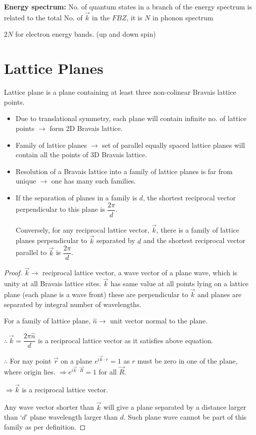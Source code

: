 \noindent
{\bf Energy spectrum:} No. of quantum states in a branch of the energy spectrum is related to the total No. of $\overrightarrow{k}$ in the $FBZ$, it is $N$ in phonon spectrum

$2N$ for electron energy bands. (up and down spin)

\section*{Lattice Planes}

Lattice plane is a plane containing at least three non-colinear Bravais lattice points.
\begin{itemize}
\item Due to translational symmetry, each plane will contain infinite no. of lattice points $\to$ form 2D Bravais lattice.

\item Family of lattice planes $\to$ set of parallel equally spaced lattice planes will contain all the points of 3D Bravais lattice.

\item Resolution of a Bravais lattice into a family of lattice planes is far from unique $\to$ one has many such families.

\item If the separation of planes in a family is $d$, the shortest reciprocal vector perpendicular to this plane is $\dfrac{2\pi}{d}$.

Conversely, for any reciprocal lattice vector, $\overrightarrow{k}$, there is a family of lattice planes perpendicular to $\overrightarrow{k}$ separated by $d$ and the shortest reciprocal vector parallel to $\overrightarrow{k}$ is $\dfrac{2\pi}{d}$.
\end{itemize}

\begin{proof}

$\overrightarrow{k}\to$ reciprocal lattice vector, a wave vector of a plane wave, which is unity at all Bravais lattice sites. $\overrightarrow{k}$ has same value at all points lying on a lattice plane (each plane is a wave front) these are perpendicular to $\overrightarrow{k}$ and planes are separated by integral number of wavelengths.

For a family of lattice plane, $\widehat{n}\to$ unit vector normal to the plane.

$\therefore \ \overrightarrow{k}=\dfrac{2\pi\widehat{n}}{d}$ is a reciprocal lattice vector as it satisfies above equation.

$\therefore$ For nay point $\overrightarrow{r}$ on a plane $e^{i\overrightarrow{k}\cdot r}=1$ as $r$ must be zero in one of the plane, where origin lies. $\Rightarrow e^{i\overrightarrow{k}\cdot \overrightarrow{R}}=1$ for all $\overrightarrow{R}$.

$\Rightarrow \overrightarrow{k}$ is a reciprocal lattice vector.

Any wave vector shorter than $\overrightarrow{k}$ will give a plane separated by a distance larger than `$d$' plane wavelength larger than $d$. Such plane wave cannot be part of this family as per definition.
\end{proof}

